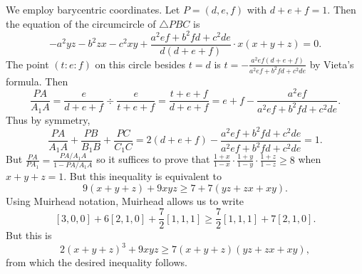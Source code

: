 We employ barycentric coordinates. Let $P=(d,e,f)$ with $d+e+f=1$. Then the equation of the circumcircle of $\triangle{PBC}$ is \[-a^2yz-b^2zx-c^2xy+\frac{a^2ef+b^2fd+c^2de}{d(d+e+f)}\cdot x(x+y+z)=0.\] The point $(t:e:f)$ on this circle besides $t=d$ is $t=-\frac{a^2ef(d+e+f)}{a^2ef+b^2fd+c^2de}$ by Vieta's formula. Then \[\frac{PA}{A_1A}=\frac{e}{d+e+f}\div\frac{e}{t+e+f}=\frac{t+e+f}{d+e+f}=e+f-\frac{a^2ef}{a^2ef+b^2fd+c^2de}.\] Thus by symmetry, \[\frac{PA}{A_1A}+\frac{PB}{B_1B}+\frac{PC}{C_1C}=2(d+e+f)-\frac{a^2ef+b^2fd+c^2de}{a^2ef+b^2fd+c^2de}=1.\] But $\frac{PA}{PA_1}=\frac{PA/A_1A}{1-PA/A_1A}$ so it suffices to prove that $\frac{1+x}{1-x}\cdot\frac{1+y}{1-y}\cdot\frac{1+z}{1-z}\geq8$ when $x+y+z=1$. But this inequality is equivalent to \[9(x+y+z)+9xyz\geq7+7(yz+zx+xy).\] Using Muirhead notation, Muirhead allows us to write \[[3,0,0]+6[2,1,0]+\frac{7}{2}[1,1,1]\geq\frac{7}{2}[1,1,1]+7[2,1,0].\] But this is \[2(x+y+z)^3+9xyz\geq7(x+y+z)(yz+zx+xy),\] from which the desired inequality follows.